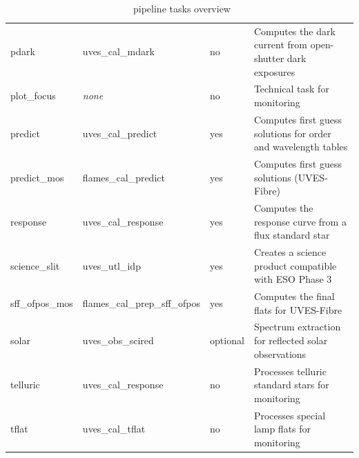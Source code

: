 \begin{table}[htbp]
\begin{tabular}{|l|l|l|p{7cm}|}
pdark            &uves\_cal\_mdark           &no       &Computes the dark current from open-shutter dark exposures\\
plot\_focus      &{\it none}                 &no       &Technical task for monitoring\\
predict          &uves\_cal\_predict         &yes      &Computes first guess solutions for order and wavelength tables\\
predict\_mos     &flames\_cal\_predict       &yes      &Computes first guess solutions (UVES-Fibre)\\
response         &uves\_cal\_response        &yes      &Computes the response curve from a flux standard star\\
science\_slit    &uves\_utl\_idp             &yes      &Creates a science product compatible with ESO Phase 3\\
sff\_ofpos\_mos  &flames\_cal\_prep\_sff\_ofpos &yes   &Computes the final flats for UVES-Fibre\\
solar            &uves\_obs\_scired          &optional &Spectrum extraction for reflected solar observations\\
telluric         &uves\_cal\_response        &no       &Processes telluric standard stars for monitoring\\
tflat            &uves\_cal\_tflat           &no       &Processes special lamp flats for monitoring\\
\hline
\end{tabular}
\caption{\instname\ pipeline tasks overview}
\end{table}
